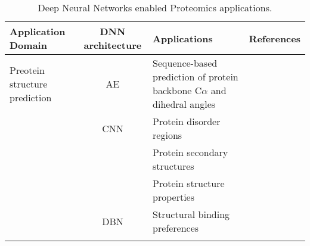 \begin{table}[h!]
\centering
\begin{tabular}{|| l | c | l | l ||}
    \hline
    Application Domain & DNN architecture & Applications & References\\
    \hline \hline
    Preotein structure prediction & AE & Sequence-based prediction of protein backbone C$\alpha$ and dihedral angles & \\
    & CNN & Protein disorder regions & \\
    &     & Protein secondary structures & \\
    &     & Protein structure properties & \\
    & DBN & Structural binding preferences & \\
    &     
    \hline
\end{tabular}
\caption{Deep Neural Networks enabled Proteomics applications.}
\label{tab:PS-DNN}
\end{table}